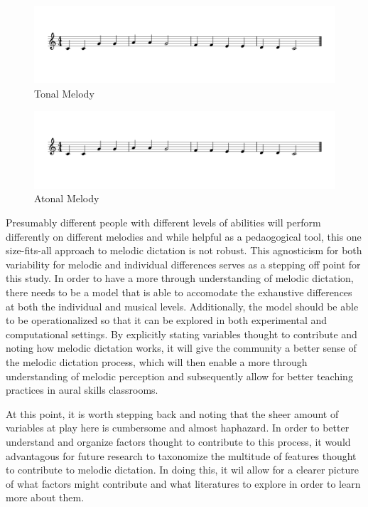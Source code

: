 \documentclass[]{book}
\theoremstyle{definition}
\theoremstyle{definition}
\theoremstyle{definition}
\theoremstyle{remark}
\begin{document}
\begin{figure}

{\centering \includegraphics[width=0.8\linewidth]{img/musicalexamples/MMD_Figure2-1} 

}

\caption{Tonal Melody}\label{fig:shortmelody1}
\end{figure}

\begin{figure}

{\centering \includegraphics[width=0.8\linewidth]{img/musicalexamples/MMD_Figure2-1} 

}

\caption{Atonal Melody}\label{fig:shortmelody2}
\end{figure}

Presumably different people with different levels of abilities will
perform differently on different melodies and while helpful as a
pedaogogical tool, this one size-fits-all approach to melodic dictation
is not robust. This agnosticism for both variability for melodic and
individual differences serves as a stepping off point for this study. In
order to have a more through understanding of melodic dictation, there
needs to be a model that is able to accomodate the exhaustive
differences at both the individual and musical levels. Additionally, the
model should be able to be operationalized so that it can be explored in
both experimental and computational settings. By explicitly stating
variables thought to contribute and noting how melodic dictation works,
it will give the community a better sense of the melodic dictation
process, which will then enable a more through understanding of melodic
perception and subsequently allow for better teaching practices in aural
skills classrooms.

At this point, it is worth stepping back and noting that the sheer
amount of variables at play here is cumbersome and almost haphazard. In
order to better understand and organize factors thought to contribute to
this process, it would advantagous for future research to taxonomize the
multitude of features thought to contribute to melodic dictation. In
doing this, it wil allow for a clearer picture of what factors might
contribute and what literatures to explore in order to learn more about
them.
\end{document}
